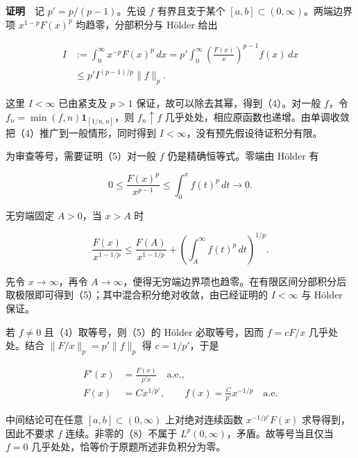 \documentclass[11pt,a4paper]{article}
\begin{document}
\textbf{证明}　记 \(p'=p/(p-1)\)。先设 \(f\) 有界且支于某个
\([a,b]\subset(0,\infty)\)。两端边界项 \(x^{1-p}F(x)^p\)
均趋零，分部积分与 Hölder 给出

\begin{equation}
\begin{aligned}
I&:=\int_0^\infty x^{-p}F(x)^p\,dx
=p'\int_0^\infty\left(\frac{F(x)}x\right)^{p-1}f(x)\,dx\\
&\le p'I^{(p-1)/p}\|f\|_p.
\end{aligned}
\tag{5}
\end{equation}

这里 \(I<\infty\) 已由紧支及 \(p>1\)
保证，故可以除去其幂，得到（4）。对一般 \(f\)，令
\(f_n=\min(f,n)\mathbf1_{[1/n,n]}\)，则 \(f_n\uparrow f\)
几乎处处，相应原函数也递增。由单调收敛把（4）推广到一般情形，同时得到
\(I<\infty\)，没有预先假设待证积分有限。

为审查等号，需要证明（5）对一般 \(f\) 仍是精确恒等式。零端由 Hölder 有

\begin{equation}
0\le\frac{F(x)^p}{x^{p-1}}\le\int_0^x f(t)^p\,dt\longrightarrow0.
\tag{6}
\end{equation}

无穷端固定 \(A>0\)，当 \(x>A\) 时

\begin{equation}
\frac{F(x)}{x^{1-1/p}}
\le\frac{F(A)}{x^{1-1/p}}+
\left(\int_A^\infty f(t)^p\,dt\right)^{1/p}.
\tag{7}
\end{equation}

先令 \(x\to\infty\)，再令
\(A\to\infty\)，便得无穷端边界项也趋零。在有限区间分部积分后取极限即可得到（5）；其中混合积分绝对收敛，由已经证明的
\(I<\infty\) 与 Hölder 保证。

若 \(f\ne0\) 且（4）取等号，则（5）的 Hölder 必取等号，因而 \(f=cF/x\)
几乎处处。结合 \(\|F/x\|_p=p'\|f\|_p\) 得 \(c=1/p'\)，于是

\begin{equation}
\begin{aligned}
F'(x)&=\frac{F(x)}{p'x}\quad\text{a.e.},\\
F(x)&=C x^{1/p'},\qquad
f(x)=\frac C{p'}x^{-1/p}\quad\text{a.e.}
\end{aligned}
\tag{8}
\end{equation}

中间结论可在任意 \([a,b]\subset(0,\infty)\) 上对绝对连续函数
\(x^{-1/p'}F(x)\) 求导得到，因此不要求 \(f\) 连续。非零的（8）不属于
\(L^p(0,\infty)\)，矛盾。故等号当且仅当 \(f=0\)
几乎处处，恰等价于原题所述非负积分为零。
\end{document}
